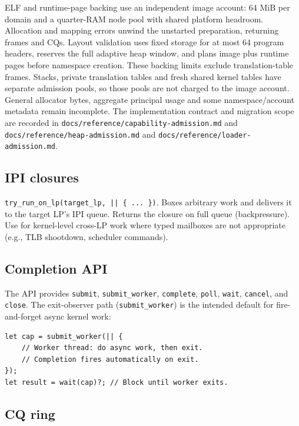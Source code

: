 ELF and runtime-page backing use an independent image account: 64 MiB per
domain and a quarter-RAM node pool with shared platform headroom. Allocation
and mapping errors unwind the unstarted preparation, returning frames and CQs.
Layout validation uses fixed storage for at most 64 program headers, reserves
the full adaptive heap window, and plans image plus runtime pages before
namespace creation. These backing limits exclude translation-table frames.
Stacks, private translation tables and fresh shared kernel tables have separate
admission pools, so those pools are not charged to the image account. General
allocator bytes, aggregate principal usage and some namespace/account metadata
remain incomplete. The implementation contract
and migration scope are recorded in
\texttt{docs/reference/capability-admission.md} and
\texttt{docs/reference/heap-admission.md} and
\texttt{docs/reference/loader-admission.md}.

\subsection{IPI closures}

\texttt{try\_run\_on\_lp(target\_lp, || \{ ... \})}. Boxes arbitrary work and
delivers it to the target LP's IPI queue. Returns the closure on full queue
(backpressure). Use for kernel-level cross-LP work where typed mailboxes are not
appropriate (e.g., TLB shootdown, scheduler commands).

\subsection{Completion API}

The API provides \texttt{submit}, \texttt{submit\_worker}, \texttt{complete},
\texttt{poll}, \texttt{wait}, \texttt{cancel}, and \texttt{close}. The exit-observer path
(\texttt{submit\_worker}) is the intended default for fire-and-forget async
kernel work:

\begin{lstlisting}[style=rustCode]
let cap = submit_worker(|| {
    // Worker thread: do async work, then exit.
    // Completion fires automatically on exit.
});
let result = wait(cap)?; // Block until worker exits.
\end{lstlisting}

\subsection{CQ ring}


